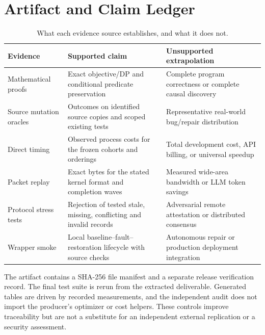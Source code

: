 \section{Artifact and Claim Ledger}
\begin{table}[h]
\centering\small
\caption{What each evidence source establishes, and what it does not.}
\begin{tabularx}{\linewidth}{@{}p{.22\linewidth}XX@{}}
\toprule
Evidence & Supported claim & Unsupported extrapolation\\
\midrule
Mathematical proofs & Exact objective/DP and conditional predicate preservation & Complete program correctness or complete causal discovery\\
Source mutation oracles & Outcomes on identified source copies and scoped existing tests & Representative real-world bug/repair distribution\\
Direct timing & Observed process costs for the frozen cohorts and orderings & Total development cost, API billing, or universal speedup\\
Packet replay & Exact bytes for the stated kernel format and completion waves & Measured wide-area bandwidth or LLM token savings\\
Protocol stress tests & Rejection of tested stale, missing, conflicting and invalid records & Adversarial remote attestation or distributed consensus\\
Wrapper smoke & Local baseline--fault--restoration lifecycle with source checks & Autonomous repair or production deployment integration\\
\bottomrule
\end{tabularx}
\end{table}

The artifact contains a SHA-256 file manifest and a separate release verification record. The final test suite is rerun from the extracted deliverable. Generated tables are driven by recorded measurements, and the independent audit does not import the producer's optimizer or cost helpers. These controls improve traceability but are not a substitute for an independent external replication or a security assessment.
